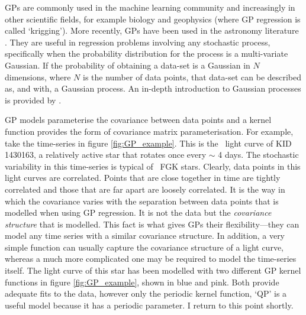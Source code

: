 GPs are commonly used in the machine learning community and increasingly
in other scientific fields, for example biology and geophysics (where GP
regression is called `krigging').
More recently, GPs have been used in the astronomy literature \citep[see
\eg][]{Gibson2012, Haywood2014, Haywood2015, Evans2015, Rajpaul2015,
Rajpaul2016, Aigrain2016}.
They are useful in regression problems involving any stochastic process,
specifically when the probability distribution for the process is a
multi-variate Gaussian.
If the probability of obtaining a data-set is a Gaussian in $N$ dimensions,
where $N$ is the number of data points, that data-set can be described as, and
with, a Gaussian process.
An in-depth introduction to Gaussian processes is provided by
\citet{Rasmussen2005}.

GP models parameterise the covariance between data points and a kernel
function provides the form of covariance matrix parameterisation.
For example, take the time-series in figure \ref{fig:GP_example}.
This is the \kepler\ light curve of KID 1430163, a relatively active star that
rotates once every $\sim$ 4 days.
The stochastic variability in this time-series is typical of \kepler\ FGK
stars.
Clearly, data points in this light curves are correlated.
Points that are close together in time are tightly correlated and those that
are far apart are loosely correlated.
It is the way in which the covariance varies with the separation between data
points that is modelled when using GP regression.
It is not the data but the {\it covariance structure} that is modelled.
This fact is what gives GPs their flexibility---they can model any time
series with a similar covariance structure.
In addition, a very simple function can usually capture the covariance
structure of a light curve, whereas a much more complicated one may be
required to model the time-series itself.
The light curve of this star has been modelled with two different GP kernel
functions in figure \ref{fig:GP_example}, shown in blue and pink.
Both provide adequate fits to the data, however only the periodic kernel
function, `QP' is a useful model because it has a periodic parameter.
I return to this point shortly.

